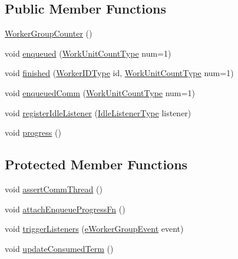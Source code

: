 \subsection*{Public Member Functions}
\begin{DoxyCompactItemize}
\item 
\hyperlink{structvt_1_1worker_1_1_worker_group_counter_a88169cef0c2a49dc51f8f77e8136080f}{Worker\+Group\+Counter} ()
\item 
void \hyperlink{structvt_1_1worker_1_1_worker_group_counter_adbcab001bd3585539767059478456fa2}{enqueued} (\hyperlink{namespacevt_1_1worker_a8080c49350b0520151601a8b24d6c6cf}{Work\+Unit\+Count\+Type} num=1)
\item 
void \hyperlink{structvt_1_1worker_1_1_worker_group_counter_a6b77b96f91b97de8d59685a2504a9e6a}{finished} (\hyperlink{namespacevt_a656e362091da17b9b93d0655b36e3392}{Worker\+I\+D\+Type} id, \hyperlink{namespacevt_1_1worker_a8080c49350b0520151601a8b24d6c6cf}{Work\+Unit\+Count\+Type} num=1)
\item 
void \hyperlink{structvt_1_1worker_1_1_worker_group_counter_af638994494fff8661d7cef5008014ab8}{enqueued\+Comm} (\hyperlink{namespacevt_1_1worker_a8080c49350b0520151601a8b24d6c6cf}{Work\+Unit\+Count\+Type} num=1)
\item 
void \hyperlink{structvt_1_1worker_1_1_worker_group_counter_a8b08821803e2b9ecad9167dc79d2795c}{register\+Idle\+Listener} (\hyperlink{structvt_1_1worker_1_1_worker_group_counter_ae91ad4af172549bb99e1b7c32a1a0f71}{Idle\+Listener\+Type} listener)
\item 
void \hyperlink{structvt_1_1worker_1_1_worker_group_counter_aa8ff0b55fb1a1501690db258ced55899}{progress} ()
\end{DoxyCompactItemize}
\subsection*{Protected Member Functions}
\begin{DoxyCompactItemize}
\item 
void \hyperlink{structvt_1_1worker_1_1_worker_group_counter_a30b0164f0d85080bb272e8930b02df4c}{assert\+Comm\+Thread} ()
\item 
void \hyperlink{structvt_1_1worker_1_1_worker_group_counter_a20ddb42ebdebae2134ecb33feef95d19}{attach\+Enqueue\+Progress\+Fn} ()
\item 
void \hyperlink{structvt_1_1worker_1_1_worker_group_counter_a39e2bdc226316ec5d4cddc3a6d10fb52}{trigger\+Listeners} (\hyperlink{namespacevt_1_1worker_abcb798436f1cdc4fab035def5b912d1f}{e\+Worker\+Group\+Event} event)
\item 
void \hyperlink{structvt_1_1worker_1_1_worker_group_counter_a8aa7187f5ced78fc69e7f323817ea752}{update\+Consumed\+Term} ()
\end{DoxyCompactItemize}


